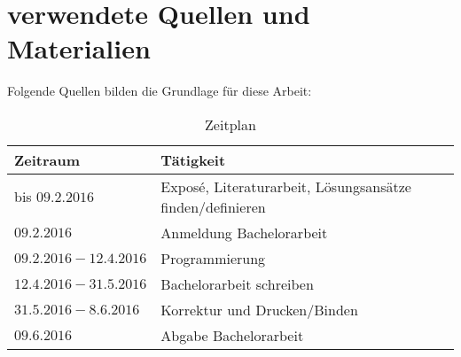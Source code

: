 \documentclass[a4,abstract=on]{scrartcl}
\begin{document}
\section{verwendete Quellen und Materialien}
Folgende Quellen bilden die Grundlage für diese Arbeit:

\begingroup
			\renewcommand{\section}[2]{}
			
			
		\endgroup

\clearpage
\section{Zeitplan der Bachelorarbeit}
\noindent
\begin{table}[h]
  \begin{tabular}{|l|l|}
	\hline
   \textbf{Zeitraum} & \textbf{Tätigkeit}\\
	\hline
   bis $09.2.2016$ & Exposé, Literaturarbeit, Lösungsansätze finden/definieren \\
	\hline
  $09.2.2016$ & Anmeldung Bachelorarbeit\\
	\hline
  $09.2.2016 - 12.4.2016$ & Programmierung\\
	\hline
  $12.4.2016 - 31.5.2016$ & Bachelorarbeit schreiben\\
	\hline
   $31.5.2016 - 8.6.2016$ & Korrektur und Drucken/Binden \\
	\hline
   $09.6.2016$ & Abgabe Bachelorarbeit\\
	\hline
  \end{tabular}
  \caption{Zeitplan}
  \end{table}
\end{document}
